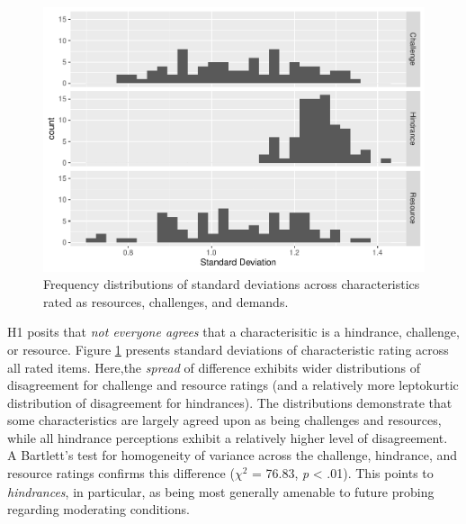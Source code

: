 \documentclass[
  man]{apa7}
\begin{document}
\begin{figure}
\centering
\includegraphics{Submission_files/figure-latex/overallhist-1.pdf}
\caption{\label{fig:overallhist}Frequency distributions of standard deviations across characteristics rated as resources, challenges, and demands.}
\end{figure}

H1 posits that \emph{not everyone agrees} that a characterisitic is a hindrance, challenge, or resource. Figure \ref{fig:overallhist} presents standard deviations of characteristic rating across all rated items. Here,the \emph{spread} of difference exhibits wider distributions of disagreement for challenge and resource ratings (and a relatively more leptokurtic distribution of disagreement for hindrances). The distributions demonstrate that some characteristics are largely agreed upon as being challenges and resources, while all hindrance perceptions exhibit a relatively higher level of disagreement. A Bartlett's test for homogeneity of variance across the challenge, hindrance, and resource ratings confirms this difference (\(\chi^2_{}\) = 76.83, \emph{p} \textless{} .01). This points to \emph{hindrances}, in particular, as being most generally amenable to future probing regarding moderating conditions.
\end{document}
